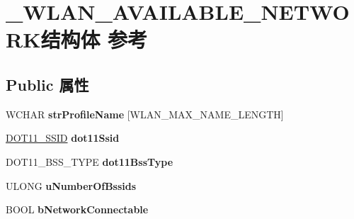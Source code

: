 \hypertarget{struct___w_l_a_n___a_v_a_i_l_a_b_l_e___n_e_t_w_o_r_k}{}\section{\+\_\+\+W\+L\+A\+N\+\_\+\+A\+V\+A\+I\+L\+A\+B\+L\+E\+\_\+\+N\+E\+T\+W\+O\+R\+K结构体 参考}
\label{struct___w_l_a_n___a_v_a_i_l_a_b_l_e___n_e_t_w_o_r_k}
\subsection*{Public 属性}
\begin{DoxyCompactItemize}
\item 
\mbox{\label{struct___w_l_a_n___a_v_a_i_l_a_b_l_e___n_e_t_w_o_r_k_a5bf8d05b20ccc3aef59fecdec27ea78e}} 
W\+C\+H\+AR {\bfseries str\+Profile\+Name} \mbox{[}W\+L\+A\+N\+\_\+\+M\+A\+X\+\_\+\+N\+A\+M\+E\+\_\+\+L\+E\+N\+G\+TH\mbox{]}
\item 
\mbox{\label{struct___w_l_a_n___a_v_a_i_l_a_b_l_e___n_e_t_w_o_r_k_a6c015814bc19cb7ba48c47a58b401f1d}} 
\hyperlink{struct___d_o_t11___s_s_i_d}{D\+O\+T11\+\_\+\+S\+S\+ID} {\bfseries dot11\+Ssid}
\item 
\mbox{\label{struct___w_l_a_n___a_v_a_i_l_a_b_l_e___n_e_t_w_o_r_k_ae0260da2fa0806d1c9b929d1bd0306ea}} 
D\+O\+T11\+\_\+\+B\+S\+S\+\_\+\+T\+Y\+PE {\bfseries dot11\+Bss\+Type}
\item 
\mbox{\label{struct___w_l_a_n___a_v_a_i_l_a_b_l_e___n_e_t_w_o_r_k_adadb22b1ed753e036cbf5a6c0c27bcbf}} 
U\+L\+O\+NG {\bfseries u\+Number\+Of\+Bssids}
\item 
\mbox{\label{struct___w_l_a_n___a_v_a_i_l_a_b_l_e___n_e_t_w_o_r_k_a131686d4cd921c00a58088c2bcb50a00}} 
B\+O\+OL {\bfseries b\+Network\+Connectable}
\item 
\mbox{\label{struct___w_l_a_n___a_v_a_i_l_a_b_l_e___n_e_t_w_o_r_k_ae0d6b3f77104e8c758a71e751eaf5de4}} 

\end{DoxyCompactItemize}
